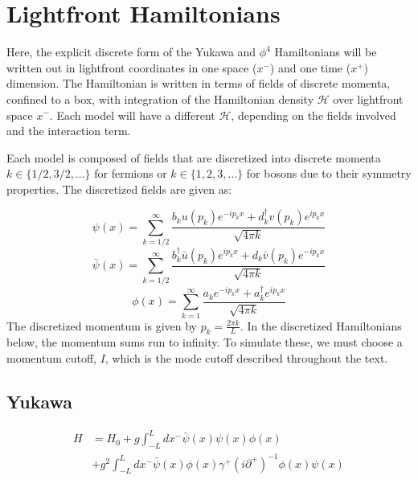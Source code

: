 \section{Lightfront Hamiltonians}
\label{subsec:lightfront-hamiltonian}


Here, the explicit discrete form of the Yukawa and $\phi^4$ Hamiltonians will be written out in lightfront coordinates in one space ($x^-$) and one time ($x^+$) dimension.
The Hamiltonian is written in terms of fields of discrete momenta, confined to a box, with integration of the Hamiltonian density $\mathcal{H}$ over lightfront space $x^-$. Each model will have a different $\mathcal{H}$, depending on the fields involved and the interaction term.

Each model is composed of fields that are discretized into discrete momenta $k \in \{1/2, 3/2, \dots\}$ for fermions or $k \in \{1, 2, 3, \dots\}$ for bosons due to their symmetry properties. 
The discretized fields are given as:

\begin{equation}
    \label{eq:psi_discrete}
    \psi(x) = \sum_{k = 1/2}^\infty\frac{b_k u(p_k)e^{-ip_k x} + d_k^\dagger v(p_k)e^{ip_k x}}{\sqrt{4\pi k}}
\end{equation}
\begin{equation}
    \label{eq:psibar_discrete}
    \bar \psi(x)= \sum_{k = 1/2}^\infty\frac{b_k^\dagger \bar u(p_k)e^{ip_k x} + d_k \bar v(p_k)e^{-ip_k x}}{\sqrt{4\pi k}}
\end{equation}
\begin{equation}
    \label{eq:phi_discrete}
    \phi(x) = \sum_{k = 1}^\infty\frac{a_k e^{-ip_k x} + a_k^\dagger e^{ip_k x}}{\sqrt{4\pi k}}
\end{equation}
The discretized momentum is given by $p_k = \frac{2\pi k}{L}$. In the discretized Hamiltonians below, the momentum sums run to infinity. To simulate these, we must choose a momentum cutoff, $I$, which is the mode cutoff described throughout the text. 


\subsection{Yukawa}
\begin{align}
    \label{eq:yukawa-hamiltonian-fields}
    H &= H_0 + g\int_{-L}^L dx^- \bar \psi(x) \psi(x) \phi(x)\\ 
    &+ g^2\int_{-L}^L  dx^- \bar \psi(x) \phi(x) \gamma^+\left(i\partial^+ \right)^{-1}\phi(x) \psi(x) \nonumber
\end{align}




